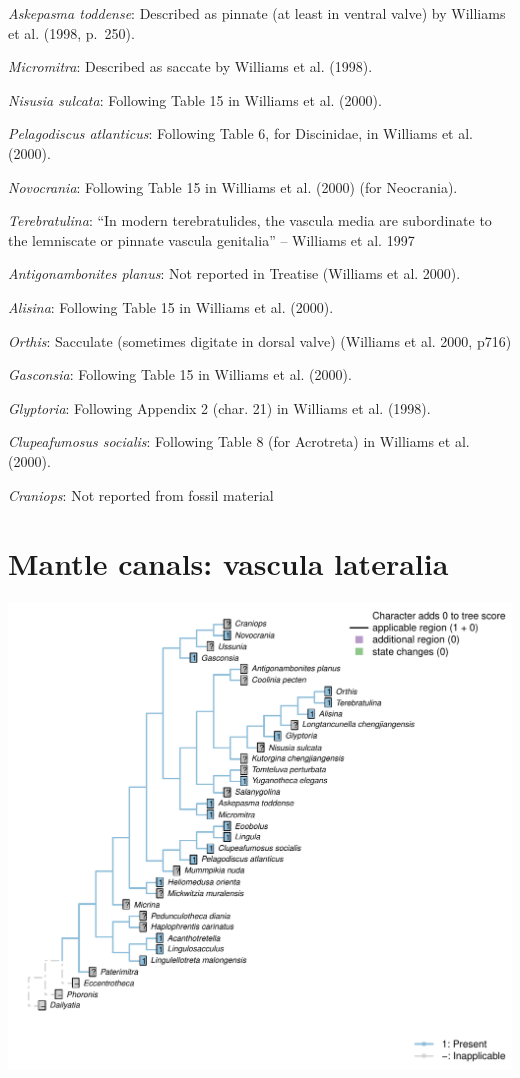 \documentclass[]{book}
\theoremstyle{definition}
\theoremstyle{definition}
\theoremstyle{definition}
\theoremstyle{remark}
\begin{document}
\emph{Askepasma toddense}: Described as pinnate (at least in ventral
valve) by Williams et al. (1998, p.~250).

\emph{Micromitra}: Described as saccate by Williams et al. (1998).

\emph{Nisusia sulcata}: Following Table 15 in Williams et al. (2000).

\emph{Pelagodiscus atlanticus}: Following Table 6, for Discinidae, in
Williams et al. (2000).

\emph{Novocrania}: Following Table 15 in Williams et al. (2000) (for
Neocrania).

\emph{Terebratulina}: ``In modern terebratulides, the vascula media are
subordinate to the lemniscate or pinnate vascula genitalia'' -- Williams
et al. 1997

\emph{Antigonambonites planus}: Not reported in Treatise (Williams et
al. 2000).

\emph{Alisina}: Following Table 15 in Williams et al. (2000).

\emph{Orthis}: Sacculate (sometimes digitate in dorsal valve) (Williams
et al. 2000, p716)

\emph{Gasconsia}: Following Table 15 in Williams et al. (2000).

\emph{Glyptoria}: Following Appendix 2 (char. 21) in Williams et al.
(1998).

\emph{Clupeafumosus socialis}: Following Table 8 (for Acrotreta) in
Williams et al. (2000).

\emph{Craniops}: Not reported from fossil material

\hypertarget{mantle-canals-vascula-lateralia}{%
\section*{Mantle canals: vascula
lateralia}\label{mantle-canals-vascula-lateralia}}

\includegraphics{Brachiopod_phylogeny_files/figure-latex/unnamed-chunk-5-81.pdf}
\end{document}
